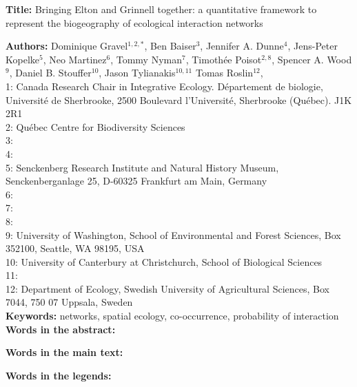 \documentclass[12pt]{article}
\begin{document}
\linenumbers 
\modulolinenumbers[1]

\textbf{Title:} Bringing Elton and Grinnell together: a quantitative framework to represent the biogeography of ecological interaction networks

\textbf{Authors:} Dominique Gravel$^{1,2,*}$, Ben Baiser$^{3}$, Jennifer A. Dunne$^{4}$, Jens-Peter Kopelke$^{5}$, Neo
Martinez$^{6}$, Tommy Nyman$^{7}$, Timoth\'ee Poisot$^{2,8}$,  Spencer A. Wood$^{9}$, Daniel B. Stouffer$^{10}$, Jason Tylianakis$^{10,11}$ Tomas Roslin$^{12}$,\\

1: Canada Research Chair in Integrative Ecology. D\'epartement de
biologie, Universit\'e de Sherbrooke,  2500 Boulevard l'Universit\'e, 
Sherbrooke (Québec).  J1K 2R1\\

2: Qu\'ebec Centre for Biodiversity Sciences\\

3: \\

4: \\

5: Senckenberg Research Institute and Natural History Museum, Senckenberganlage 25, D-60325 Frankfurt am Main, Germany\\

6:\\

7:\\

8:\\

9: University of Washington, School of Environmental and Forest Sciences, 
Box 352100, Seattle, WA 98195, USA\\

10: University of Canterbury at Christchurch, School of Biological Sciences\\

11:\\

12: Department of Ecology, Swedish University of Agricultural Sciences, Box 7044, 750 07 Uppsala, Sweden\\ 

\textbf{Keywords:} networks, spatial ecology, co-occurrence, probability of interaction\\

\textbf{Words in the abstract:} 

\textbf{Words in the main text:} 

\textbf{Words in the legends:}  
\end{document}
